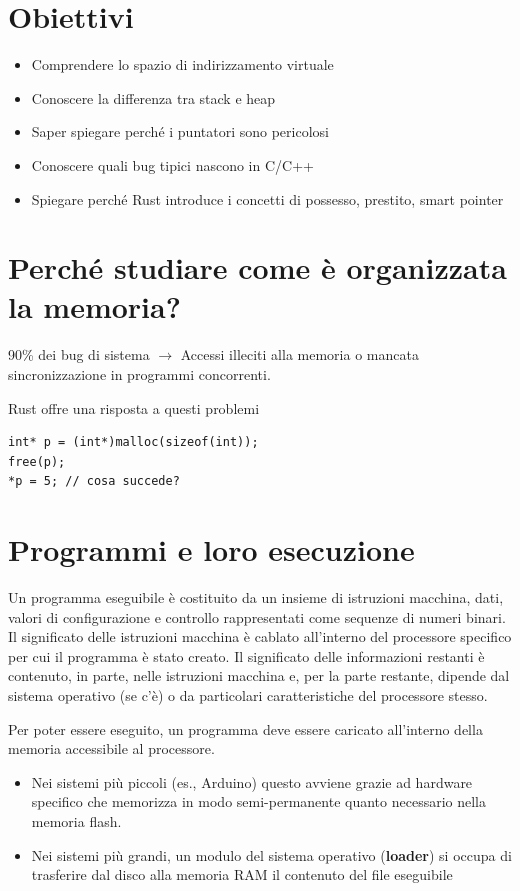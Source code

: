 \section{Obiettivi}

\begin{itemize}
  \item Comprendere lo spazio di indirizzamento virtuale
  \item Conoscere la differenza tra stack e heap
  \item Saper spiegare perché i puntatori sono pericolosi
  \item Conoscere quali bug tipici nascono in C/C++
  \item Spiegare perché Rust introduce i concetti di possesso, prestito, smart pointer
\end{itemize}

\section{Perché studiare come è organizzata la memoria?  }

90\% dei bug di sistema  $\rightarrow$ Accessi illeciti alla memoria o mancata sincronizzazione in programmi concorrenti.

Rust offre una risposta a questi problemi

\begin{verbatim}
int* p = (int*)malloc(sizeof(int)); 
free(p); 
*p = 5; // cosa succede? 
\end{verbatim}

\section{Programmi e loro esecuzione  }

Un programma eseguibile è costituito da un insieme di istruzioni macchina, dati, valori di configurazione e controllo rappresentati come sequenze di numeri binari.
Il significato delle istruzioni macchina è cablato all'interno del processore specifico per cui il programma è stato creato.
Il significato delle informazioni restanti è contenuto, in parte, nelle istruzioni macchina e, per la parte restante, dipende dal sistema operativo (se c'è) o da particolari caratteristiche del processore stesso.\newline

Per poter essere eseguito, un programma deve essere caricato all'interno della memoria accessibile al processore.
\begin{itemize}
  \item Nei sistemi più piccoli (es., Arduino) questo avviene grazie ad hardware specifico che memorizza in modo semi-permanente quanto necessario nella memoria flash.
  \item Nei sistemi più grandi, un modulo del sistema operativo (\textbf{loader}) si occupa di trasferire dal disco alla memoria RAM il contenuto del file eseguibile
\end{itemize}

